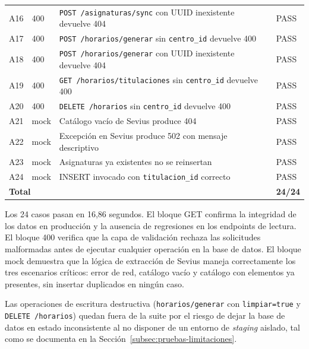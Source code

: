 \begin{table}[hbtp]
\begin{tabular}{p{0.6cm}p{1.4cm}p{10.0cm}p{0.8cm}}
A16 & 400 & \texttt{POST /asignaturas/sync} con UUID inexistente devuelve 404 & PASS \\
A17 & 400 & \texttt{POST /horarios/generar} sin \texttt{centro\_id} devuelve 400 & PASS \\
A18 & 400 & \texttt{POST /horarios/generar} con UUID inexistente devuelve 404 & PASS \\
A19 & 400 & \texttt{GET /horarios/titulaciones} sin \texttt{centro\_id} devuelve 400 & PASS \\
A20 & 400 & \texttt{DELETE /horarios} sin \texttt{centro\_id} devuelve 400 & PASS \\
\hline
A21 & mock & Catálogo vacío de Sevius produce 404 & PASS \\
A22 & mock & Excepción en Sevius produce 502 con mensaje descriptivo & PASS \\
A23 & mock & Asignaturas ya existentes no se reinsertan & PASS \\
A24 & mock & INSERT invocado con \texttt{titulacion\_id} correcto & PASS \\
\hline
\multicolumn{3}{l}{\textbf{Total}} & \textbf{24/24} \\
\hline
\end{tabular}
\end{table}

Los 24 casos pasan en 16,86 segundos. El bloque GET confirma la integridad de los datos en producción y la ausencia de regresiones en los endpoints de lectura. El bloque 400 verifica que la capa de validación rechaza las solicitudes malformadas antes de ejecutar cualquier operación en la base de datos. El bloque mock demuestra que la lógica de extracción de Sevius maneja correctamente los tres escenarios críticos: error de red, catálogo vacío y catálogo con elementos ya presentes, sin insertar duplicados en ningún caso.

Las operaciones de escritura destructiva (\texttt{horarios/generar} con \texttt{limpiar=true} y \texttt{DELETE /horarios}) quedan fuera de la suite por el riesgo de dejar la base de datos en estado inconsistente al no disponer de un entorno de \textit{staging} aislado, tal como se documenta en la Sección~\ref{subsec:pruebas-limitaciones}.
